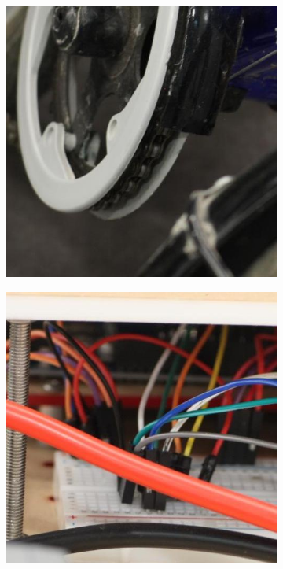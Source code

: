 \begin{figure}
    \centering
    \begin{subfigure}[t]{0.19\textwidth}
        \centering
        \includegraphics[width=1\textwidth]{images/dataset/Canon5D2_5_160_6400_bicycle_6_mean.JPG}
    \end{subfigure}
    \hfill
    \begin{subfigure}[t]{0.19\textwidth}
        \centering
        \includegraphics[width=1\textwidth]{images/dataset/Canon5D2_5_160_6400_circuit_11_mean.JPG}

\end{subfigure}
\end{figure}

